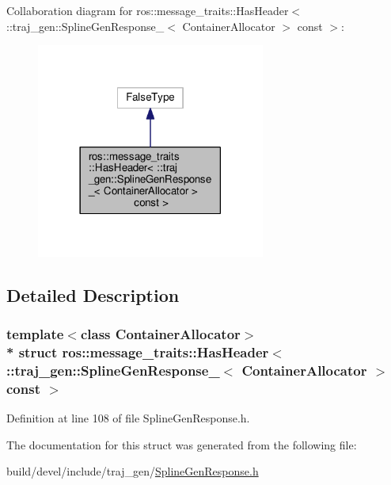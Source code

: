 Collaboration diagram for ros\+:\+:message\+\_\+traits\+:\+:Has\+Header$<$ \+:\+:traj\+\_\+gen\+:\+:Spline\+Gen\+Response\+\_\+$<$ Container\+Allocator $>$ const $>$\+:
\nopagebreak
\begin{figure}[H]
\begin{center}
\leavevmode
\includegraphics[width=213pt]{structros_1_1message__traits_1_1_has_header_3_01_1_1traj__gen_1_1_spline_gen_response___3_01_con2e598ba3f88ed72171ebcc30dc5d20c0}
\end{center}
\end{figure}


\subsection{Detailed Description}
\subsubsection*{template$<$class Container\+Allocator$>$\\*
struct ros\+::message\+\_\+traits\+::\+Has\+Header$<$ \+::traj\+\_\+gen\+::\+Spline\+Gen\+Response\+\_\+$<$ Container\+Allocator $>$ const  $>$}



Definition at line 108 of file Spline\+Gen\+Response.\+h.



The documentation for this struct was generated from the following file\+:\begin{DoxyCompactItemize}
\item 
build/devel/include/traj\+\_\+gen/\hyperlink{_spline_gen_response_8h}{Spline\+Gen\+Response.\+h}\end{DoxyCompactItemize}
